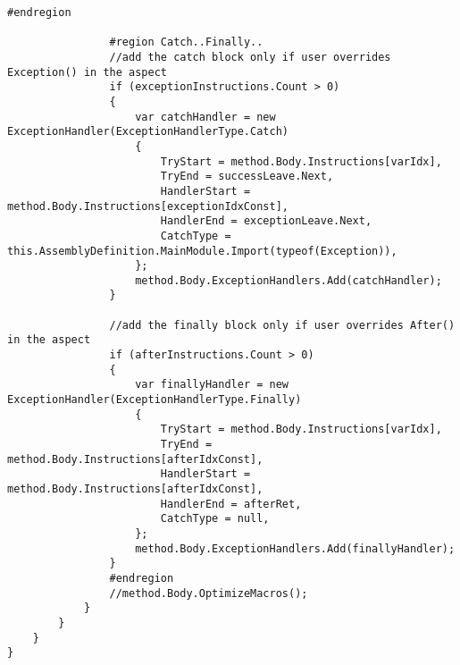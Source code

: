\begin{lstlisting}[caption={../buffalo/Injectors/MethodBoundaryInjector.cs}, label=../buffalo/Injectors/MethodBoundaryInjector.cs, frame=tb, basicstyle=\scriptsize]
                #endregion

                #region Catch..Finally..
                //add the catch block only if user overrides Exception() in the aspect
                if (exceptionInstructions.Count > 0)
                {
                    var catchHandler = new ExceptionHandler(ExceptionHandlerType.Catch)
                    {
                        TryStart = method.Body.Instructions[varIdx],
                        TryEnd = successLeave.Next,
                        HandlerStart = method.Body.Instructions[exceptionIdxConst],
                        HandlerEnd = exceptionLeave.Next,
                        CatchType = this.AssemblyDefinition.MainModule.Import(typeof(Exception)),
                    };
                    method.Body.ExceptionHandlers.Add(catchHandler);
                }

                //add the finally block only if user overrides After() in the aspect
                if (afterInstructions.Count > 0)
                {
                    var finallyHandler = new ExceptionHandler(ExceptionHandlerType.Finally)
                    {
                        TryStart = method.Body.Instructions[varIdx],
                        TryEnd = method.Body.Instructions[afterIdxConst],
                        HandlerStart = method.Body.Instructions[afterIdxConst],
                        HandlerEnd = afterRet,
                        CatchType = null,
                    };
                    method.Body.ExceptionHandlers.Add(finallyHandler);
                }
                #endregion
                //method.Body.OptimizeMacros();
            }
        }
    }
}
\end{lstlisting}

